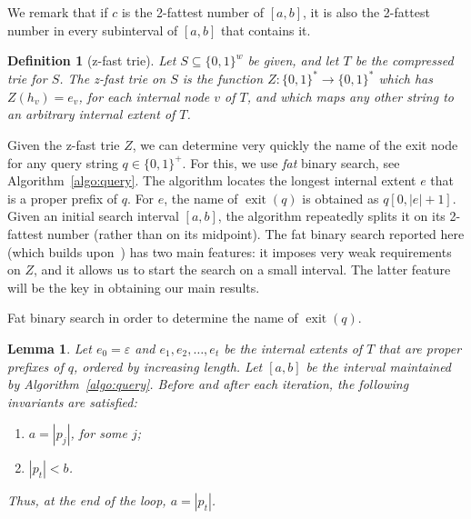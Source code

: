 \documentclass[a4paper,11pt]{article}
\newtheorem{lemma}[theorem]{Lemma}
\newtheorem{definition}[theorem]{Definition}
\newcommand{\eps}{\varepsilon}
\newcommand{\?}{\mskip1.5mu}
\DeclareMathOperator{\exit}{exit}
\begin{document}
We remark that if $c$ is the 2-fattest number of $[a, b]$, it 
is also the 2-fattest number in every subinterval of $[a, b]$ 
that contains it.

\begin{definition}[z-fast trie]
Let $S \subseteq \{0, 1\}^w$ be given, and let $T$ be the 
compressed trie for $S$. The \emph{z-fast trie on $S$} is 
the function $Z : \{0, 1\}^* \rightarrow \{0, 1\}^*$ which 
has $Z(h_v) = e_v$, for each internal node $v$ of $T$, and 
which maps any other string to an arbitrary internal extent
of $T$.
\end{definition}

Given the z-fast trie $Z$, we can determine very quickly
the name of the exit node for any query string $q \in \{0,1\}^+$.
For this, we use \emph{fat} binary search, see Algorithm~\ref{algo:query}. 
The algorithm locates the longest internal extent $e$ that is a 
proper prefix of $q$. For $e$, the name of $\exit(q)$ is obtained as
$q[0, |e| + 1]$. Given an initial search interval $[a,b]$, the 
algorithm repeatedly splits it on its 2-fattest number 
(rather than on its midpoint).
The fat binary search reported here (which builds 
upon~\cite{BelazzouguiBoVi10}) has two main features:
it imposes very weak requirements on $Z$, and it allows us to start 
the search on a small interval. The latter feature will be the key 
in obtaining our main results.

\begin{algorithm}
\KwOut{the name of $\exit(q)$}
\If{$a = 0 \wedge e_\text{root}\neq\eps$}{%
  \Return $\eps$\;
} 
\caption{Fat binary search in order to 
  determine the name of $\exit(q)$.}
\label{algo:query}
\end{algorithm}

\begin{lemma}\label{lem:correctness}
Let $e_0 = \eps$ and $e_1, e_2, \dots, e_t$ be the internal 
extents of $T$ that are \emph{proper} prefixes of $q$, ordered by 
increasing length.  Let $[a, b]$ be the interval maintained by 
Algorithm~\ref{algo:query}. Before and after each iteration, the 
following invariants are satisfied: 
\begin{enumerate}
    \item\label{enu:lema} $a = |p_j|$, for some $j$;
    \item\label{enu:lemb} $|p_t|< b$.
\end{enumerate}
Thus, at the end of the loop, $a = |p_t|$.
\end{lemma}
\end{document}
